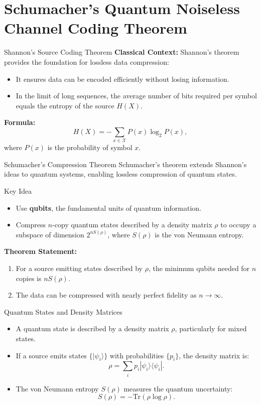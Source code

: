 \section{Schumacher's Quantum Noiseless Channel Coding Theorem}

\begin{frame}{Shannon's Source Coding Theorem}
    \textbf{Classical Context:} Shannon's theorem provides the foundation for lossless data compression:
    \begin{itemize}
        \item It ensures data can be encoded efficiently without losing information.
        \item In the limit of long sequences, the average number of bits required per symbol equals the entropy of the source \( H(X) \).
    \end{itemize}
    \textbf{Formula:}
    \[
    H(X) = -\sum_{x \in \mathcal{X}} P(x) \log_2 P(x),
    \]
    where \( P(x) \) is the probability of symbol \( x \).
\end{frame}

\begin{frame}{Schumacher's Compression Theorem}
    Schumacher's theorem extends Shannon's ideas to quantum systems, enabling lossless compression of quantum states.
    \begin{block}{Key Idea}
        \begin{itemize}
            \item Use \textbf{qubits}, the fundamental units of quantum information.
            \item Compress \( n \)-copy quantum states described by a density matrix \( \rho \) to occupy a subspace of dimension \( 2^{n S(\rho)} \), where \( S(\rho) \) is the von Neumann entropy.
        \end{itemize}
    \end{block}
    \textbf{Theorem Statement:}
    \begin{enumerate}
        \item For a source emitting states described by \( \rho \), the minimum qubits needed for \( n \) copies is \( n S(\rho) \).
        \item The data can be compressed with nearly perfect fidelity as \( n \to \infty \).
    \end{enumerate}
\end{frame}

\begin{frame}{Quantum States and Density Matrices}
    \begin{itemize}
        \item A quantum state is described by a density matrix \( \rho \), particularly for mixed states.
        \item If a source emits states \( \{ |\psi_i\rangle \} \) with probabilities \( \{ p_i \} \), the density matrix is:
        \[
        \rho = \sum_i p_i |\psi_i\rangle \langle \psi_i|.
        \]
        \item The von Neumann entropy \( S(\rho) \) measures the quantum uncertainty:
        \[
        S(\rho) = -\text{Tr}(\rho \log \rho).
        \]
    \end{itemize}
\end{frame}

